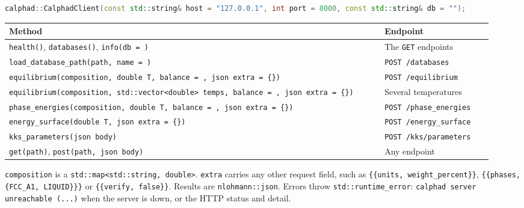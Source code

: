 \documentclass[12pt,a4paper]{article}
\begin{document}
\begin{lstlisting}[basicstyle={\scriptsize\ttfamily},language=C++]
calphad::CalphadClient(const std::string& host = "127.0.0.1", int port = 8000, const std::string& db = "");
\end{lstlisting}
\begingroup\small
\begin{longtable}{>{\raggedright\arraybackslash}p{0.730\linewidth}>{\raggedright\arraybackslash}p{0.217\linewidth}}
\toprule
\textbf{Method} & \textbf{Endpoint} \\
\midrule
\endhead
\texttt{health()}, \texttt{databases()}, \texttt{info(db = \textquotedbl{}\textquotedbl{})} & The \texttt{GET} endpoints \\
\texttt{load\_\allowbreak{}database\_\allowbreak{}path(path,\allowbreak{} name = \textquotedbl{}\textquotedbl{})} & \texttt{POST /\allowbreak{}databases} \\
\texttt{equilibrium(composition,\allowbreak{} double T,\allowbreak{} balance = \textquotedbl{}\textquotedbl{},\allowbreak{} json extra = \{\})} & \texttt{POST /\allowbreak{}equilibrium} \\
\texttt{equilibrium(composition,\allowbreak{} std::vector\textless{}double\textgreater{} temps,\allowbreak{} balance = \textquotedbl{}\textquotedbl{},\allowbreak{} json extra = \{\})} & Several temperatures \\
\texttt{phase\_\allowbreak{}energies(composition,\allowbreak{} double T,\allowbreak{} balance = \textquotedbl{}\textquotedbl{},\allowbreak{} json extra = \{\})} & \texttt{POST /\allowbreak{}phase\_\allowbreak{}energies} \\
\texttt{energy\_\allowbreak{}surface(double T,\allowbreak{} json extra = \{\})} & \texttt{POST /\allowbreak{}energy\_\allowbreak{}surface} \\
\texttt{kks\_\allowbreak{}parameters(json body)} & \texttt{POST /\allowbreak{}kks/\allowbreak{}parameters} \\
\texttt{get(path)}, \texttt{post(path,\allowbreak{} json body)} & Any endpoint \\
\bottomrule
\end{longtable}
\endgroup
\texttt{composition} is a \texttt{std::map\textless{}std::string,\allowbreak{} double\textgreater{}}. \texttt{extra} carries any other request field, such as \texttt{\{\{\textquotedbl{}units\textquotedbl{},\allowbreak{} \textquotedbl{}weight\_\allowbreak{}percent\textquotedbl{}\}\}}, \texttt{\{\{\textquotedbl{}phases\textquotedbl{},\allowbreak{} \{\textquotedbl{}FCC\_\allowbreak{}A1\textquotedbl{},\allowbreak{} \textquotedbl{}LIQUID\textquotedbl{}\}\}\}} or \texttt{\{\{\textquotedbl{}verify\textquotedbl{},\allowbreak{} false\}\}}. Results are \texttt{nlohmann::json}. Errors throw \texttt{std::runtime\_\allowbreak{}error}: \texttt{calphad server unreachable (.\allowbreak{}.\allowbreak{}.\allowbreak{})} when the server is down, or the HTTP status and detail.
\end{document}
